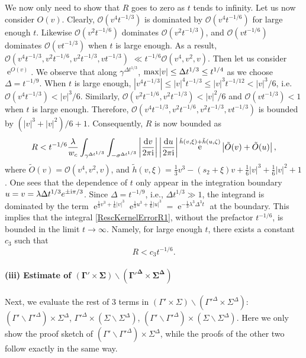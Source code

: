 \documentclass[cmp]{svjour}
\numberwithin{theorem}{section}
\numberwithin{equation}{section}
\DeclareMathOperator{\e}{e}
\def\ii{{\rm i}}
\begin{document}
We now only need to show that $R$ goes to zero as $t$ tends to infinity. Let us now consider $O(v)$. Clearly, $\mathcal{O}(v^4 t^{-1/3})$ is dominated by $\mathcal{O}(v^4 t^{-1/6})$ for large enough $t$. Likewise $\mathcal{O}(v^2 t^{-1/6})$ dominates $\mathcal{O}(v^2 t^{-1/3})$, and $\mathcal{O}( v t^{-1/6})$ dominates $\mathcal{O}(v t^{-1/3} )$ when $t$ is large enough. As a result, $\mathcal{O}(v^4 t^{-1/3}, v^2 t^{-1/6}, v^2 t^{-1/3} , v t^{-1/3})$ $\ll t^{-1/6} \mathcal{O}(v^4 , v^2, v)$. 
Then let us consider $\e^{O(v)}$. We observe that along $\gamma^{\Delta t^{1/3}}$, ${\rm max} |v| \leq \Delta t^{1/3} \leq t^{1/4}$ as we choose $\Delta = t^{-1/9}$. When $t$ is large enough, $|v^4 t^{-1/3}| \leq |v|^4 t^{-1/3} \leq |v|^{3} t^{-1/12} < |v|^3/6$, i.e. $\mathcal{O}(v^4 t^{-1/3}) < |v|^3/6$. Similarly, $\mathcal{O}(v^2 t^{-1/6}, v^2 t^{-1/3}) <  |v|^2/6 $ and $\mathcal{O}( v t^{-1/3}) < 1$ when $t$ is large enough. Therefore, $\mathcal{O}(v^4 t^{-1/3} , v^2 t^{-1/6} , v^2 t^{-1/3} , v t^{-1/3})$ is bounded by $(|v|^3 + |v|^2)/6+1$. Consequently, $R$ is now bounded as
\begin{equation}\label{RescKernelErrorR1}    
	R < t^{- 1/6} \frac{\lambda }{w_c } \int_{\gamma^{\Delta t^{1/3}}}  \int_{ -\sigma^{\Delta t^{1/3}}} \left|\frac{\mathrm{d} v}{2 \pi \ii} \right| \left|\frac{\mathrm{d} u}{2 \pi \ii} \right|
	\e^{\tilde{h}(v,\xi) + \tilde{h}(u,\zeta)} 
	\left|\tilde{O}(v) + \tilde{O}(u) \right|,
\end{equation}
where $\tilde{O}(v) = \mathcal{O}(v^4  , v^2 , v)$, and $\tilde{h}(v,\xi) = \frac{1}{3} v^3 - (s_2 +\xi) v + \frac{1}{6} |v|^3 + \frac{1}{6} |v|^2 + 1$. One sees that the dependence of $t$ only appear in the integration boundary $u = v = \lambda \Delta t^{1/3} e^{\pm \ii \pi /3}$. Since $ \Delta = t^{-1/9}$, i.e., $\Delta t^{1/3} \gg 1$, the integrand is dominated by the term $\e^{\frac{1}{3} v^3 + \frac{1}{6} |v|^3}\e^{\frac{1}{3} u^3 + \frac{1}{6} |u|^3} = \e^{ - \frac{1}{3} \lambda^3 \Delta^3 t }$ at the boundary. This implies that the integral \eqref{RescKernelErrorR1}, without the prefactor $t^{-1/6}$, is bounded in the limit $t\rightarrow \infty$. Namely, for large enough $t$, there exists a constant $c_3$ such that
\[R < c_3 t^{-1/6}.\] 



\paragraph{(iii) Estimate of $\boldsymbol{(\Gamma' \times \Sigma) \backslash ( \Gamma'^{\Delta} \times \Sigma^{\Delta})  }$}
Next, we evaluate the rest of 3 terms in $(\Gamma' \times \Sigma) \backslash ( \Gamma'^{\Delta} \times \Sigma^{\Delta}) $: $(\Gamma' \backslash \Gamma'^{\Delta}) \times \Sigma^{\Delta}$, $\Gamma'^{\Delta} \times (\Sigma \backslash \Sigma^{\Delta})$, $(\Gamma' \backslash \Gamma'^{\Delta}) \times  (\Sigma \backslash \Sigma^{\Delta})$. Here we only show the proof sketch of $(\Gamma' \backslash \Gamma'^{\Delta}) \times \Sigma^{\Delta}$, while the proofs of the other two follow exactly in the same way.
\end{document}
